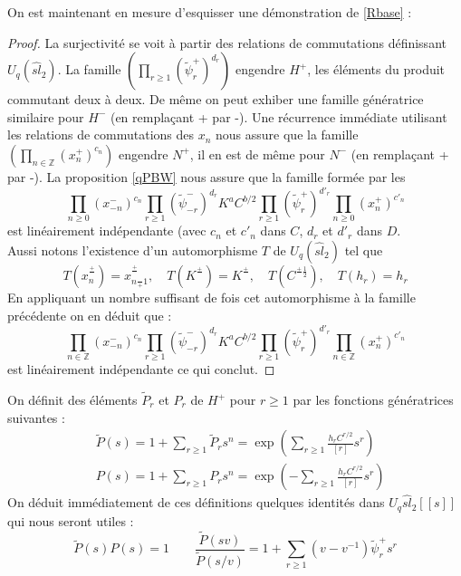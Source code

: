 \documentclass[12pt]{article}
\theoremstyle{definition}
\begin{document}
On est maintenant en mesure d'esquisser une démonstration de \ref{Rbase} : 
\begin{proof}
La surjectivité se voit à partir des relations de commutations définissant $U_q(\widehat{sl}_{2})$. La famille $\left(\underset{r\geqslant 1}{\prod}(\tilde{\psi}^{+}_{r})^{d_r}\right)$ engendre $H^+$, les éléments du produit commutant deux à deux. De même on peut exhiber une famille génératrice similaire pour $H^-$ (en remplaçant + par -). Une récurrence immédiate utilisant les relations de commutations des $x_n$ nous assure que la famille $\left(\underset{n\in\mathbb{Z}}{\prod}(x_n^+)^{c_n}\right)$ engendre $N^+$, il en est de même pour $N^-$ (en remplaçant + par -). 
 La proposition \ref{qPBW} nous assure que la famille formée par les $$\underset{n\geqslant 0}{\prod}(x^{-}_{-n})^{c_n}\underset{r\geqslant 1}{\prod}(\widetilde{\psi}^{-}_{-r})^{d_r}K^aC^{b/2}\underset{r\geqslant 1}{\prod}(\widetilde{\psi}^{+}_{r})^{d'_r}\underset{n\geqslant 0}{\prod}(x^{+}_{n})^{c'_n}$$ est linéairement indépendante (avec $c_n$ et $c'_n$ dans $C$, $d_r$ et $d'_r$ dans $D$.\\ Aussi notons l'existence d'un automorphisme $T$ de $U_q(\widehat{sl}_{2})$ tel que $$T(x_n^{\frac{+}{}})=x^{\frac{+}{}}_{n\frac{}{+}1},\quad T(K^{\frac{+}{}})=K^{\frac{+}{}},\quad T(C^{\frac{+}{}\frac{1}{2}}),\quad T(h_r)=h_r$$ En appliquant un nombre suffisant de fois cet automorphisme à la famille précédente on en déduit que : $$\underset{n\in\mathbb{Z}}{\prod}(x^{-}_{-n})^{c_n}\underset{r\geqslant 1}{\prod}(\widetilde{\psi}^{-}_{-r})^{d_r}K^aC^{b/2}\underset{r\geqslant 1}{\prod}(\widetilde{\psi}^{+}_{r})^{d'_r}\underset{n\in\mathbb{Z}}{\prod}(x^{+}_{n})^{c'_n}$$ est linéairement indépendante ce qui conclut.
\end{proof}
On définit des éléments $\tilde{P}_r$ et $P_r$ de $H^+$ pour $r\geqslant 1$ par les fonctions génératrices suivantes :
\begin{align}
&\widetilde{P}(s)=1+\underset{r\geqslant 1}{\sum}\widetilde{P}_r s^n=\exp\left(\underset{r\geqslant 1}{\sum}\frac{h_r C^{r/2}}{[r]}s^r\right)\\
&P(s)=1+\underset{r\geqslant 1}{\sum}P_r s^n=\exp\left(-\underset{r\geqslant 1}{\sum}\frac{h_r C^{r/2}}{[r]}s^r\right)
\end{align}
On déduit immédiatement de ces définitions quelques identités dans $U_q{\widehat{sl}_2}[[s]]$qui nous seront utiles : \begin{equation}\label{idP}
\widetilde{P}(s)P(s)=1\qquad \frac{\widetilde{P}(sv)}{\widetilde{P}(s/v)}=1+\underset{r\geq 1}{\sum}(v-v^{-1})\widetilde{\psi}^+_rs^r
\end{equation}
\end{document}
